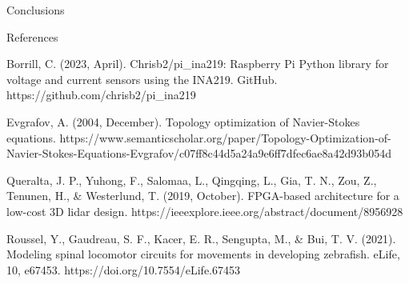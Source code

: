 \documentclass[final, 16pt]{beamer}
\newlength{\colwidth}
\begin{document}
\begin{frame}[t]
\begin{columns}[t]
\begin{column}{\colwidth}
\begin{block}{Conclusions}
  \end{block}
  
  \begin{block}{References}

    \begin{hangparas}{.25in}{1}
      Borrill, C. (2023, April). Chrisb2/pi\_ina219: Raspberry Pi Python library for voltage and current sensors using the INA219. GitHub. https://github.com/chrisb2/pi\_ina219
    \end{hangparas}

    \begin{hangparas}{.25in}{1}
      Evgrafov, A. (2004, December). Topology optimization of Navier-Stokes equations. https://www.semanticscholar.org/paper/Topology-Optimization-of-Navier-Stokes-Equations-Evgrafov/c07ff8c44d5a24a9e6ff7dfec6ae8a42d93b054d 
    \end{hangparas}

    \begin{hangparas}{.25in}{1}
      Queralta, J. P., Yuhong, F., Salomaa, L., Qingqing, L., Gia, T. N., Zou, Z., Tenunen, H., \& Westerlund, T. (2019, October). FPGA-based architecture for a low-cost 3D lidar design. https://ieeexplore.ieee.org/abstract/document/8956928 
    \end{hangparas}

    \begin{hangparas}{.25in}{1}
      Roussel, Y., Gaudreau, S. F., Kacer, E. R., Sengupta, M., \& Bui, T. V. (2021). Modeling spinal locomotor circuits for movements in developing zebrafish. eLife, 10, e67453. https://doi.org/10.7554/eLife.67453
    \end{hangparas}

  \end{block}
\end{column}

\margincolumn
\end{columns}




\end{frame}
\end{document}
